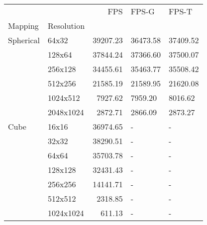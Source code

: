 \begin{tabular}{llrll}
\toprule
     &           &      FPS &    FPS-G &    FPS-T \\
Mapping & Resolution &          &          &          \\
\midrule
Spherical & 64x32 & 39207.23 & 36473.58 & 37409.52 \\
     & 128x64 & 37844.24 & 37366.60 & 37500.07 \\
     & 256x128 & 34455.61 & 35463.77 & 35508.42 \\
     & 512x256 & 21585.19 & 21589.95 & 21620.08 \\
     & 1024x512 &  7927.62 &  7959.20 &  8016.62 \\
     & 2048x1024 &  2872.71 &  2866.09 &  2873.27 \\
Cube & 16x16 & 36974.65 &        - &        - \\
     & 32x32 & 38290.51 &        - &        - \\
     & 64x64 & 35703.78 &        - &        - \\
     & 128x128 & 32431.43 &        - &        - \\
     & 256x256 & 14141.71 &        - &        - \\
     & 512x512 &  2318.85 &        - &        - \\
     & 1024x1024 &   611.13 &        - &        - \\
\bottomrule
\end{tabular}
